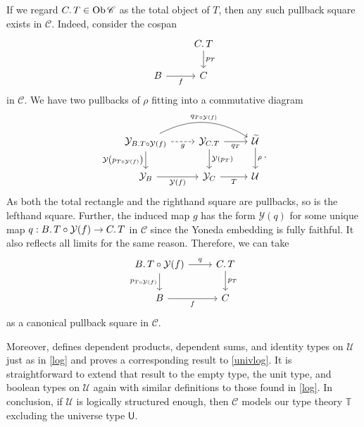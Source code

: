 \documentclass[10pt,letterpaper,cm]{nupset}
\theoremstyle{definition}
\theoremstyle{theorem}
\theoremstyle{remark}
\DeclareMathOperator{\ob}{Ob}
\newcommand{\U}{\mathsf{U}}
\newcommand{\0}{\mathbf{0}}
\newcommand{\1}{\mathbf{1}}
\newcommand{\2}{\mathbf{2}}
\renewcommand{\c}{\mathscr{C}}
\newcommand{\T}{\mathbb T}
\begin{document}
If we regard $C\ldotp{T} \in \ob{\c}$ as the total object of $T$, then any such pullback square exists in $\c$. Indeed, consider the cospan 
\[
\begin{tikzcd}
                  & C\ldotp{T} \arrow[d, "{p}_T"] \\
B \arrow[r, "f"'] & C                                  
\end{tikzcd}
\] in $\c$. We have two pullbacks of $\rho$ fitting into a commutative diagram
\[
\begin{tikzcd}
\mathcal{Y}_{B\ldotp{T \circ \mathcal{Y}(f)}} \arrow[d, "\mathcal{Y}\mleft(p_{T\circ \mathcal{Y}(f)}\mright)"'] \arrow[r, "g"', dashed] \arrow[rr, "q_{T \circ \mathcal{Y}(f)}", bend left] & \mathcal{Y}_{C\ldotp{T}} \arrow[d, "\mathcal{Y}({p}_T)"] \arrow[r, "q_T"'] & \widetilde{\mathcal{U}} \arrow[d, "\rho"] \\
\mathcal{Y}_B \arrow[r, "\mathcal{Y}(f)"']                                                                                                    & \mathcal{Y}_C \arrow[r, "T"']                                 & \mathcal{U}                              
\end{tikzcd}.
\] As both the total rectangle and the righthand square are pullbacks, so is the lefthand square. Further,  the induced map $g$ has the form $\mathcal{Y}(q)$ for some unique map $q : B\ldotp{T\circ \mathcal{Y}(f)} \to C\ldotp{T}$ in $\c$ since the Yoneda embedding is fully faithful.  It also reflects all limits for the same reason. Therefore, we can take
\[
\begin{tikzcd}
B\ldotp{T\circ \mathcal{Y}(f)} \arrow[d, "p_{T\circ \mathcal{Y}(f)}"'] \arrow[r, "q"] & C\ldotp{T} \arrow[d, "{p}_T"] \\
B \arrow[r, "f"']                                                 & C                            
\end{tikzcd}
\] as a canonical pullback square in $\c$.

\medskip

Moreover, \cite{Nat} defines dependent products, dependent sums, and identity types on $\mathcal{U}$ just as in \cref{log} and proves a corresponding result to \cref{univlog}. It is straightforward to extend that result to the empty type, the unit type, and boolean types on $\mathcal{U}$ again with similar definitions  to those found in \cref{log}. 
In conclusion, if $\mathcal{U}$ is logically structured enough, then $\c$ models our type theory $\T$ excluding the universe type $\U$.

\medskip
\end{document}

